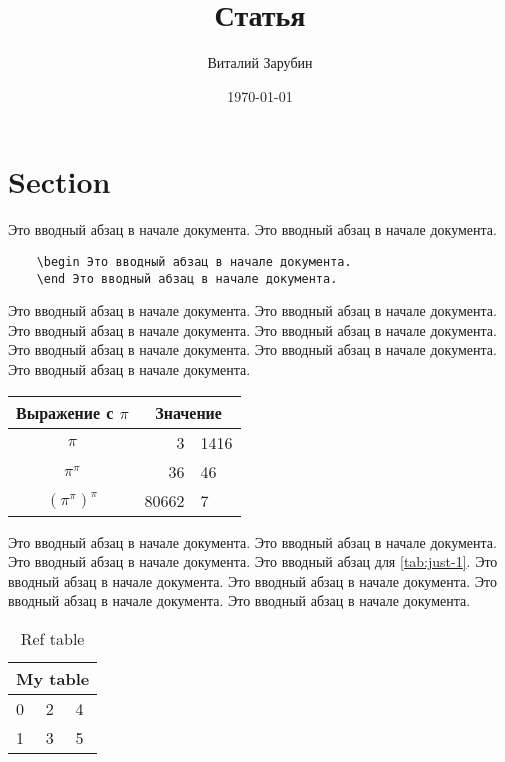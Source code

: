 \documentclass[a4paper,12pt,titlepage]{article}
\author{Виталий Зарубин}
\title{Статья}
\date{\today}
\begin{document}
    \maketitle

    \section{Section}

    Это вводный абзац в начале документа.
    Это вводный абзац в начале документа.

    \begin{verbatim}
    \begin Это вводный абзац в начале документа.
    \end Это вводный абзац в начале документа.
    \end{verbatim}

    Это вводный абзац в начале документа.
    Это вводный абзац в начале документа.
    Это вводный абзац в начале документа.
    Это вводный абзац в начале документа.
    Это вводный абзац в начале документа.
    Это вводный абзац в начале документа.
    Это вводный абзац в начале документа.

    \begin{center}
        \begin{tabular}{c r @{.} l}
            Выражение с $\pi$ &
            \multicolumn{2}{c}{Значение} \\
            \hline
            $\pi$
            & 3&1416 \\
            $\pi^{\pi}$
            & 36&46
            \\
            $(\pi^{\pi})^{\pi}$ & 80662&7 \\
        \end{tabular}
    \end{center}

    Это вводный абзац в начале документа.
    Это вводный абзац в начале документа.
    Это вводный абзац в начале документа.
    Это вводный абзац для \autoref{tab:just-1}. %
    Это вводный абзац в начале документа.
    Это вводный абзац в начале документа.
    Это вводный абзац в начале документа.
    Это вводный абзац в начале документа.

    \begin{table}[!ht]
        \begin{tabularx}{\textwidth}{|X|X|X|}
            \hline
            \multicolumn{3}{|c|}{My table}   \\ \hline
            0         & 2        & 4         \\ \hline
            1         & 3        & 5         \\ \hline
        \end{tabularx}
        \caption{Ref table}\label{tab:just-1}
    \end{table}
\end{document}
